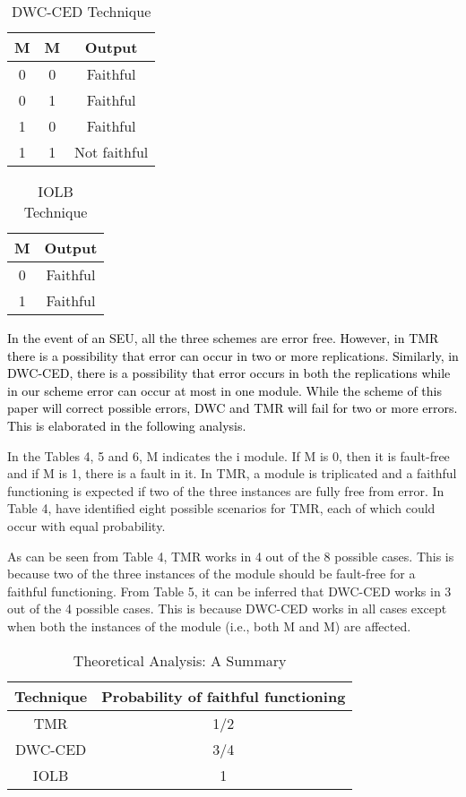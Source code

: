 \documentclass[10pt,journal,cspaper,compsoc]{IEEEtran}
\begin{document}
{{\begin{table}[!t]
\caption{DWC-CED Technique} \centering \begin{tabular}{|c| c| c|} \hline
M & M & Output  \\ [0.5ex] \hline 0 & 0 & Faithful \\ 0 & 1 & Faithful\\
1 & 0 & Faithful \\
1 & 1 & Not faithful \\ [1ex] \hline \end{tabular}
\label{table:nonlin} \end{table}

\begin{table}[!t]
\caption{IOLB Technique} \centering \begin{tabular}{|c| c|} \hline
M & Output  \\ [0.5ex] \hline 0 & Faithful \\ 1 & Faithful \\ [1ex] \hline \end{tabular}
\label{table:nonlin} \end{table}



\textcolor{black} {In the event of an SEU, all the three schemes are error free. However, in TMR there is a possibility that error can occur in two or more replications. Similarly, in DWC-CED, there is a possibility that error occurs in both the replications while in our scheme error can occur at most in one module. While the scheme of this paper will correct possible errors, DWC and TMR will fail for two or more errors. This is elaborated in the following analysis.}

In the Tables 4, 5 and 6, M indicates the i module. If M is 0, then it is fault-free and if M is 1, there is a fault in it. In TMR, a module is triplicated and a faithful functioning is expected if two of the three instances are fully free from error. In Table 4, have identified eight possible scenarios for TMR, each of which could occur with equal probability.

As can be seen from Table 4, TMR works in 4 out of the 8 possible cases. This is because two of the three instances of the module should be fault-free for a faithful functioning. From Table 5, it can be inferred that DWC-CED works in 3 out of the 4 possible cases. This is because DWC-CED works in all cases except when both the instances of the module (i.e., both M and M) are affected.


\begin{table}[!t]
\caption{Theoretical Analysis: A Summary} \centering \begin{tabular}{|c| c|} \hline
Technique & Probability of faithful functioning  \\ [0.5ex] \hline TMR & 1/2 \\ DWC-CED & 3/4\\
IOLB & 1 \\ [1ex] \hline \end{tabular}
\label{table:nonlin} \end{table}

}}
\end{document}
